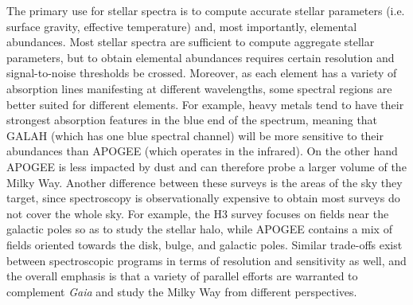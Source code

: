 The primary use for stellar spectra is to compute accurate stellar parameters (i.e. surface gravity, effective temperature) and, most importantly, elemental abundances. Most stellar spectra are sufficient to compute aggregate stellar parameters, but to obtain elemental abundances requires certain resolution and signal-to-noise thresholds be crossed. Moreover, as each element has a variety of absorption lines manifesting at different wavelengths, some spectral regions are better suited for different elements. For example, heavy metals tend to have their strongest absorption features in the blue end of the spectrum, meaning that GALAH (which has one blue spectral channel) will be more sensitive to their abundances than APOGEE (which operates in the infrared). On the other hand APOGEE is less impacted by dust and can therefore probe a larger volume of the Milky Way. Another difference between these surveys is the areas of the sky they target, since spectroscopy is observationally expensive to obtain most surveys do not cover the whole sky. For example, the H3 survey focuses on fields near the galactic poles so as to study the stellar halo, while APOGEE contains a mix of fields oriented towards the disk, bulge, and galactic poles. Similar trade-offs exist between spectroscopic programs in terms of resolution and sensitivity as well, and the overall emphasis is that a variety of parallel efforts are warranted to complement \textit{Gaia} and study the Milky Way from different perspectives.


